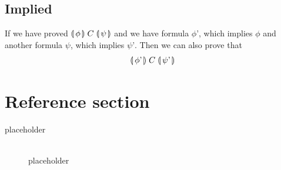 \documentclass{article}
\newcommand\Hoaretriple[3]{%
  \llparenthesis\,#1\,\rrparenthesis
  \mathrel{#2}\nolinebreak 
  \llparenthesis\,#3\,\rrparenthesis
}
\begin{document}
\subsection{Implied}
\begin{flushleft}
If we have proved $\Hoaretriple{\phi}{ C }{\psi}$ and we have formula $\phi \text{'}$, which implies $\phi$ and another formula $\psi$, which implies $\psi \text{'}$. Then we can also prove that 
\[ \Hoaretriple{\phi \text{'}}{ C }{\psi \text{'}} \]
\end{flushleft}

\pagebreak
\section*{Reference section} \label{sec:reference}
\begin{description}
	\item[placeholder] \hfill \\ placeholder
\end{description}
\end{document}
